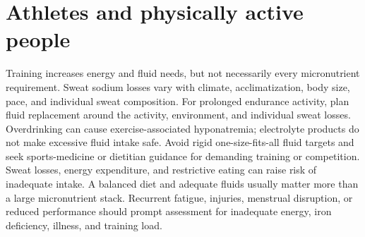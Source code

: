 \section{Athletes and physically active people}
Training increases energy and fluid needs, but not necessarily every micronutrient requirement. Sweat sodium losses vary with climate, acclimatization, body size, pace, and individual sweat composition. For prolonged endurance activity, plan fluid replacement around the activity, environment, and individual sweat losses. Overdrinking can cause exercise-associated hyponatremia; electrolyte products do not make excessive fluid intake safe. Avoid rigid one-size-fits-all fluid targets and seek sports-medicine or dietitian guidance for demanding training or competition. \cite{nataFluid}
Sweat losses, energy expenditure, and restrictive eating can raise risk of inadequate intake. A balanced diet and adequate fluids usually matter more than a large micronutrient stack. Recurrent fatigue, injuries, menstrual disruption, or reduced performance should prompt assessment for inadequate energy, iron deficiency, illness, and training load.
